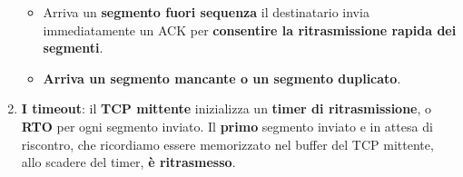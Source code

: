 \documentclass[11pt,a4paper,oneside]{book}
\theoremstyle{definition}
\begin{document}
\begin{enumerate}
\begin{itemize}
		      \item Arriva un \textbf{segmento fuori sequenza} il destinatario invia immediatamente un ACK per \textbf{consentire la ritrasmissione rapida dei segmenti}.
		      \item \textbf{Arriva un segmento mancante o un segmento duplicato}.
	      \end{itemize}
	\item \textbf{I timeout}: il \textbf{TCP mittente} inizializza un \textbf{timer di ritrasmissione}, o \textbf{RTO} per ogni segmento inviato. Il \textbf{primo} segmento inviato e in attesa di riscontro, che ricordiamo essere memorizzato nel buffer del TCP mittente, allo scadere del timer, \textbf{è ritrasmesso}.
\end{enumerate}

\pagebreak
\end{document}
